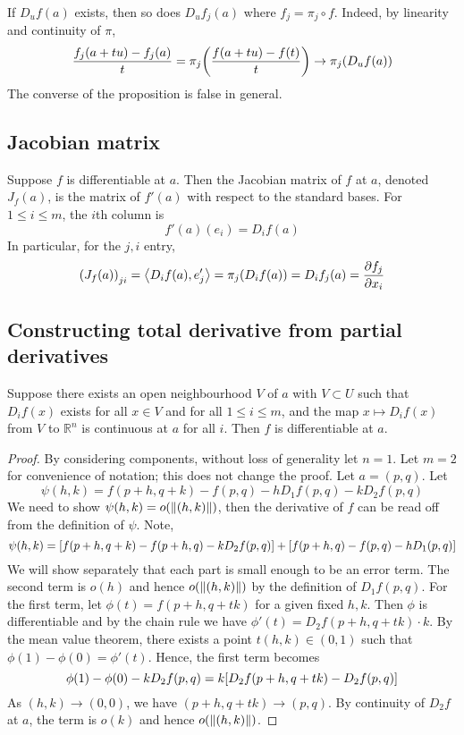 \begin{remark}
	If \( D_u f(a) \) exists, then so does \( D_u f_j(a) \) where \( f_j = \pi_j \circ f \).
	Indeed, by linearity and continuity of \( \pi \),
	\[
		\frac{f_j(a+tu) - f_j(a)}{t} = \pi_j \qty(\frac{f(a+tu) - f(t)}{t}) \to \pi_j (D_u f(a))
	\]
	The converse of the proposition is false in general.
\end{remark}

\subsection{Jacobian matrix}
\begin{definition}
	Suppose \( f \) is differentiable at \( a \).
	Then the Jacobian matrix of \( f \) at \( a \), denoted \( J_f(a) \), is the matrix of \( f'(a) \) with respect to the standard bases.
	For \( 1 \leq i \leq m \), the \( i \)th column is
	\[
		f'(a)(e_i) = D_i f(a)
	\]
	In particular, for the \( j,i \) entry,
	\[
		\qty(J_f(a))_{ji} = \left\langle{D_i f(a), e_j'}\right\rangle = \pi_j\qty(D_i f(a)) = D_i f_j(a) = \pdv{f_j}{x_i}(a)
	\]
\end{definition}

\subsection{Constructing total derivative from partial derivatives}
\begin{theorem}
	Suppose there exists an open neighbourhood \( V \) of \( a \) with \( V \subset U \) such that \( D_i f(x) \) exists for all \( x \in V \) and for all \( 1 \leq i \leq m \), and the map \( x \mapsto D_i f(x) \) from \( V \) to \( \mathbb R^n \) is continuous at \( a \) for all \( i \).
	Then \( f \) is differentiable at \( a \).
\end{theorem}
\begin{proof}
	By considering components, without loss of generality let \( n = 1 \).
	Let \( m = 2 \) for convenience of notation; this does not change the proof.
	Let \( a = (p,q) \).
	Let
	\[
		\psi(h,k) = f(p+h, q+k) - f(p,q) - h D_1 f(p,q) - k D_2 f(p,q)
	\]
	We need to show \( \psi(h,k) = o\qty(\norm{(h,k)}) \), then the derivative of \( f \) can be read off from the definition of \( \psi \).
	Note,
	\[
		\psi(h,k) = \qty[f(p+h, q+k) - f(p+h, q) - k D_2 f(p,q)] + \qty[f(p+h,q) - f(p,q) - h D_1(p,q)]
	\]
	We will show separately that each part is small enough to be an error term.
	The second term is \( o(h) \) and hence \( o\qty(\norm{(h,k)}) \) by the definition of \( D_1 f(p,q) \).
	For the first term, let \( \phi(t) = f(p+h, q+tk) \) for a given fixed \( h,k \).
	Then \( \phi \) is differentiable and by the chain rule we have \( \phi'(t) = D_2 f(p+h, q+tk) \cdot k \).
	By the mean value theorem, there exists a point \( t(h,k) \in (0,1) \) such that \( \phi(1) - \phi(0) = \phi'(t) \).
	Hence, the first term becomes
	\[
		\phi(1) - \phi(0) - k D_2 f(p,q) = k \qty[ D_2 f(p + h, q + tk) - D_2 f(p,q) ]
	\]
	As \( (h,k) \to (0,0) \), we have \( (p+h, q + tk) \to (p,q) \).
	By continuity of \( D_2 f \) at \( a \), the term is \( o(k) \) and hence \( o\qty(\norm{(h,k)}) \).
\end{proof}

